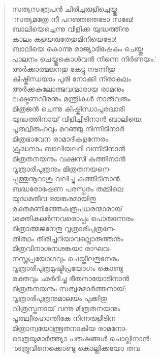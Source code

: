 \begin{verse}
സത്യസ്വരൂപന്‍ ചിരിച്ചരുളിച്ചെയ്തു:\\
‘സത്യമത്രേ നീ പറഞ്ഞതെടോ സഖേ!\\
ബാലിയെച്ചെന്നു വിളിക്ക യുദ്ധത്തിനു\\
കാലം കളയരുതേതുമിനിയെടോ!\\
ബാലിയെ കൊന്നു രാജ്യാഭിഷേകം ചെയ്തു\\
പാലനം ചെയ്തുകൊള്‍വന്‍ നിന്നെ നിര്‍ണയം.’\\
അര്‍ക്കാത്മജനതു കേട്ടു നടന്നിതു\\
കിഷ്കിന്ധയാം പുരി നോക്കി നിരാകുലം\\
അര്‍ക്കകുലോത്ഭവന്മാരായ രാമനും\\
ലക്ഷ്മണവീരനും മന്ത്രികള്‍ നാല്‍വരും\\
മിത്രജന്‍ ചെന്നു കിഷ്കിന്ധാപുരദ്വാരി\\
യുദ്ധത്തിനായ് വിളിച്ചീടിനാന്‍ ബാലിയെ.\\
പൃത്ഥ്വീരുഹവും മറഞ്ഞു നിന്നീടിനാര്‍\\
മിത്രഭാവേന രാമാദികളന്നേരം.\\
ക്രുദ്ധനാം ബാലിയലറി വന്നീടിനാന്‍\\
മിത്രതനയനും വക്ഷസി കുത്തിനാന്‍\\
വൃത്രാരിപുത്രനും മിത്രതനയനെ-\\
പ്പത്തുനൂറാശു വലിച്ചു കുത്തീടിനാന്‍.\\
ബദ്ധരോഷേണ പരസ്പരം തമ്മിലെ\\
യുദ്ധമതീവ ഭയങ്കരമായിതു\\
രക്തമണിഞ്ഞേകരൂപധരന്മാരായ്\\
ശക്തികലര്‍ന്നവരൊപ്പം പൊരുന്നേരം\\
മിത്രാത്മജനേതു വൃത്രാരിപുത്രനേ-\\
തിത്ഥം തിരിച്ചറിയാവല്ലൊരുത്തനും\\
മിത്രവിനാശനശങ്കയാ രാഘവ-\\
നസ്ത്രപ്രയോഗവും ചെയ്തീലതുനേരം\\
വൃത്രാരിപുത്രമുഷ്ടിപ്രയോഗം കൊണ്ടു\\
രക്തവും ഛര്‍ദിച്ചു ഭീതനായോടിനാന്‍\\
മിത്രതനയനും സത്വരമാര്‍ത്തനായ്;\\
വൃത്രാരിപുത്രനുമാലയം പുക്കിതു.\\
വിത്രസ്തനായ് വന്നു മിത്രതനയനും\\
പൃത്ഥ്വീരഹാന്തികേ നിന്നരുളീടിന\\
മിത്രാന്വയോത്ഭൂതനാകിയ രാമനോ-\\
ടെത്രയുമാര്‍ത്ത്യാ പരുഷങ്ങള്‍ ചൊല്ലിനാന്‍:\\
‘ശത്രുവിനെക്കൊണ്ടു കൊല്ലിക്കയോ തവ\\

\end{verse}

